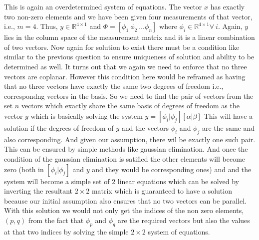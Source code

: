 \documentclass{article}
\begin{document}
This is again an overdetermined system of equations. The vector $x$ has exactly two non-zero elements and we have been given four measurements of that vector, i.e., $ m = 4 $. Thus, $ y \in \mathbb{R}^{4 \times 1} $ and $ \Phi = [ \phi_1 \ \phi_2 \ \dots \phi_n] $ where $ \phi_i \in \mathbb{R}^{4 \times 1} \forall \ i $. Again, $y$ lies in the column space of the measurement matrix and it is a linear combination of two vectors. Now again for solution to exist there must be a condition like similar to the previous question to ensure uniqueness of solution and ability to be determined as well. It turns out that we again we need to enforce that no three vectors are coplanar. However this condition here would be reframed as having that no three vectors have exactly the same two degrees of freedom i.e., correspondng vectors in the basis. So we need to find the pair of vectors from the set $n$ vectors which exactly share the same basis of degrees of freedom as the vector $y$ which is basically solving the system $y = [\phi_i | \phi_j] [\alpha | \beta]$ This will have a solution if the degrees of freedom of $y$ and the vectors $\phi_i$ and $\phi_j$ are the same and also corresponding. And given our assumption, there wil be exactly one such pair. This can be ensured by simple methods like gaussian elimination. And once the condition of the gaussian elimination is satified the other elements will become zero (both in $[\phi_i |\phi_j]$ and $y$ and they would be corresponding ones) and and the system will become a simple set of $2$ linear equations which can be solved by inverting the resultant $2 \times 2$ matrix which is guaranteed to have a solution because our initial assumption also ensures that no two vectors can be parallel. With this solution we would not only get the indices of the non zero elements,$(p,q)$ from the fact that $\phi_p$ and $\phi_q$ are the required vectors but also the values at that two indices by solving the simple $2 \times 2$ system of equations. 


\end{document}
